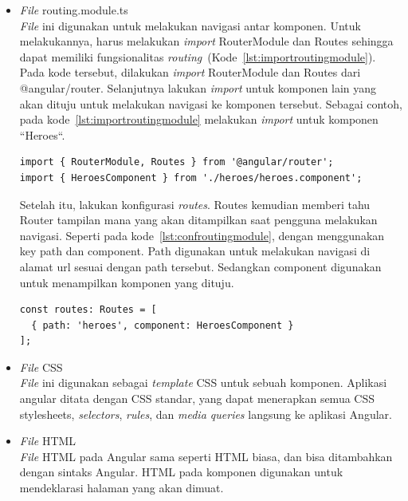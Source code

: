 \begin{itemize}
	\item \textit{File} routing.module.ts \\
		\textit{File} ini digunakan untuk melakukan navigasi antar komponen. Untuk melakukannya, harus melakukan \textit{import} RouterModule dan Routes sehingga dapat memiliki fungsionalitas \textit{routing}~(Kode~\ref{lst:importroutingmodule}). Pada kode tersebut, dilakukan \textit{import} RouterModule dan Routes dari @angular/router. Selanjutnya lakukan \textit{import} untuk komponen lain yang akan dituju untuk melakukan navigasi ke komponen tersebut. Sebagai contoh, pada kode~\ref{lst:importroutingmodule} melakukan \textit{import} untuk komponen ``Heroes``.

\begin{lstlisting}[label={lst:importroutingmodule}, caption={Contoh \textit{import} pada routing.module.ts}]
import { RouterModule, Routes } from '@angular/router';
import { HeroesComponent } from './heroes/heroes.component';
\end{lstlisting} 

		Setelah itu, lakukan konfigurasi \textit{routes}. Routes kemudian memberi tahu Router tampilan mana yang akan ditampilkan saat pengguna melakukan navigasi. Seperti pada kode~\ref{lst:confroutingmodule}, dengan menggunakan key path dan component. Path digunakan untuk melakukan navigasi di alamat url sesuai dengan path tersebut. Sedangkan component digunakan untuk menampilkan komponen yang dituju.
		
\begin{lstlisting}[label={lst:confroutingmodule}, caption=Contoh Konfigurasi \textit{Routes} pada routing.module.ts, captionpos=b]
const routes: Routes = [
  { path: 'heroes', component: HeroesComponent }
];
\end{lstlisting} 

	\item \textit{File} CSS \\
		\textit{File} ini digunakan sebagai \textit{template} CSS untuk sebuah komponen. Aplikasi angular ditata dengan CSS standar, yang dapat menerapkan  semua CSS stylesheets, \textit{selectors}, \textit{rules}, dan \textit{media queries} langsung ke aplikasi Angular.
		 
	\item \textit{File} HTML \\
		\textit{File} HTML pada Angular sama seperti HTML biasa, dan bisa ditambahkan dengan sintaks Angular. HTML pada komponen digunakan untuk mendeklarasi halaman yang akan dimuat.
		

\end{itemize}
